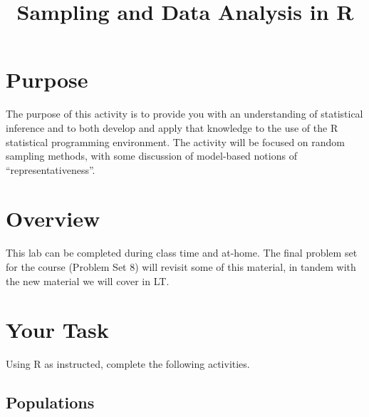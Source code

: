 \documentclass[a4paper,12pt]{article}
\title{Sampling and Data Analysis in R}
\author{}
\date{}
\begin{document}
\vspace{-4em}

\maketitle

\vspace{-4em}

\section{Purpose}

The purpose of this activity is to provide you with an understanding of statistical inference and to both develop and apply that knowledge to the use of the R statistical programming environment. The activity will be focused on random sampling methods, with some discussion of model-based notions of ``representativeness''.

\section{Overview}

This lab can be completed during class time and at-home. The final problem set for the course (Problem Set 8) will revisit some of this material, in tandem with the new material we will cover in LT.

\section{Your Task}

Using R as instructed, complete the following activities.

\subsection{Populations}
\end{document}

